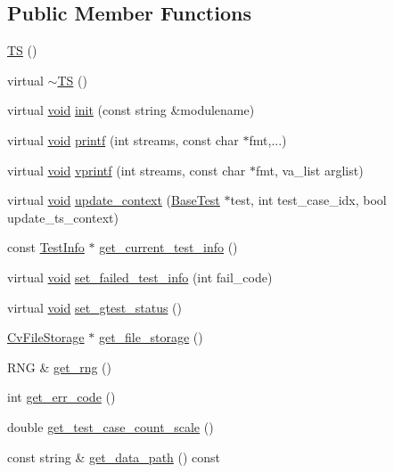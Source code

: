 \subsection*{Public Member Functions}
\begin{DoxyCompactItemize}
\item 
\hyperlink{classcvtest_1_1TS_ace108fdfb623aabd644dcb72242c1ab9}{T\-S} ()
\item 
virtual \hyperlink{classcvtest_1_1TS_aacfb2afc95e6810ffa8b6e79ecc94180}{$\sim$\-T\-S} ()
\item 
virtual \hyperlink{legacy_8hpp_a8bb47f092d473522721002c86c13b94e}{void} \hyperlink{classcvtest_1_1TS_afd42fc157b2f38b0b8445697dda8a7ef}{init} (const string \&modulename)
\item 
virtual \hyperlink{legacy_8hpp_a8bb47f092d473522721002c86c13b94e}{void} \hyperlink{classcvtest_1_1TS_a1a815088b16a33adcd3b46463c8559da}{printf} (int streams, const char $\ast$fmt,...)
\item 
virtual \hyperlink{legacy_8hpp_a8bb47f092d473522721002c86c13b94e}{void} \hyperlink{classcvtest_1_1TS_a74cbed26e6ea857c1d61a9b725c21eb3}{vprintf} (int streams, const char $\ast$fmt, va\-\_\-list arglist)
\item 
virtual \hyperlink{legacy_8hpp_a8bb47f092d473522721002c86c13b94e}{void} \hyperlink{classcvtest_1_1TS_a6e1ad1334be2799f7834dc947e913499}{update\-\_\-context} (\hyperlink{classcvtest_1_1BaseTest}{Base\-Test} $\ast$test, int test\-\_\-case\-\_\-idx, bool update\-\_\-ts\-\_\-context)
\item 
const \hyperlink{structcvtest_1_1TestInfo}{Test\-Info} $\ast$ \hyperlink{classcvtest_1_1TS_afef7a0ca6e8258335ab821190339d23e}{get\-\_\-current\-\_\-test\-\_\-info} ()
\item 
virtual \hyperlink{legacy_8hpp_a8bb47f092d473522721002c86c13b94e}{void} \hyperlink{classcvtest_1_1TS_abf37146cc357e834e346b66ed43a6e55}{set\-\_\-failed\-\_\-test\-\_\-info} (int fail\-\_\-code)
\item 
virtual \hyperlink{legacy_8hpp_a8bb47f092d473522721002c86c13b94e}{void} \hyperlink{classcvtest_1_1TS_a0b8c1e30e09b0643924c8e48f083d712}{set\-\_\-gtest\-\_\-status} ()
\item 
\hyperlink{core_2types__c_8h_a84556d1bb6f1b8b02c04c60246747a7e}{Cv\-File\-Storage} $\ast$ \hyperlink{classcvtest_1_1TS_aec859a524917c7a5bb2b8d6d0f3a6d9c}{get\-\_\-file\-\_\-storage} ()
\item 
R\-N\-G \& \hyperlink{classcvtest_1_1TS_abb74b63a6338a3af920a6d12b62a2405}{get\-\_\-rng} ()
\item 
int \hyperlink{classcvtest_1_1TS_a8bbc58789cb0f15f35ae2dca80edecb7}{get\-\_\-err\-\_\-code} ()
\item 
double \hyperlink{classcvtest_1_1TS_aacb5f5783fc120d733e494479fc6f7cb}{get\-\_\-test\-\_\-case\-\_\-count\-\_\-scale} ()
\item 
const string \& \hyperlink{classcvtest_1_1TS_a5117f2ac3591a199f89a570596b3d27d}{get\-\_\-data\-\_\-path} () const 
\end{DoxyCompactItemize}
